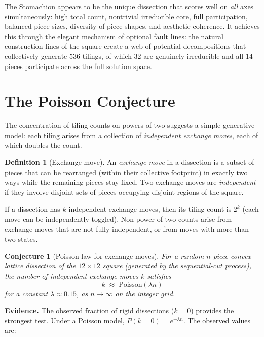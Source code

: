 \documentclass[12pt]{article}
\newtheorem{conjecture}[theorem]{Conjecture}
\theoremstyle{definition}
\newtheorem{definition}[theorem]{Definition}
\theoremstyle{remark}
\begin{document}
The Stomachion appears to be the unique dissection that scores
well on \emph{all} axes simultaneously: high total count, nontrivial
irreducible core, full participation, balanced piece sizes,
diversity of piece shapes, and aesthetic coherence. It achieves this
through the elegant mechanism of optional fault lines: the natural
construction lines of the square create a web of potential
decompositions that collectively generate $536$ tilings, of which $32$
are genuinely irreducible and all $14$ pieces participate across the
full solution space.

\section{The Poisson Conjecture}
\label{sec:poisson}

The concentration of tiling counts on powers of two suggests a simple
generative model: each tiling arises from a collection of
\emph{independent exchange moves}, each of which doubles the count.

\begin{definition}[Exchange move]
An \emph{exchange move} in a dissection is a subset of pieces that can be
rearranged (within their collective footprint) in exactly two ways while
the remaining pieces stay fixed. Two exchange moves are
\emph{independent} if they involve disjoint sets of pieces occupying
disjoint regions of the square.
\end{definition}

If a dissection has $k$ independent exchange moves, then its tiling
count is $2^k$ (each move can be independently toggled). Non-power-of-two
counts arise from exchange moves that are not fully independent, or from
moves with more than two states.

\begin{conjecture}[Poisson law for exchange moves]
\label{conj:poisson}
For a random $n$-piece convex lattice dissection of the $12 \times 12$
square (generated by the sequential-cut process), the number of
independent exchange moves $k$ satisfies
\[
k \;\approx\; \mathrm{Poisson}(\lambda n)
\]
for a constant $\lambda \approx 0.15$, as $n \to \infty$ on the integer
grid.
\end{conjecture}

\textbf{Evidence.} The observed fraction of rigid dissections ($k = 0$)
provides the strongest test. Under a Poisson model,
$P(k = 0) = e^{-\lambda n}$. The observed values are:
\end{document}

